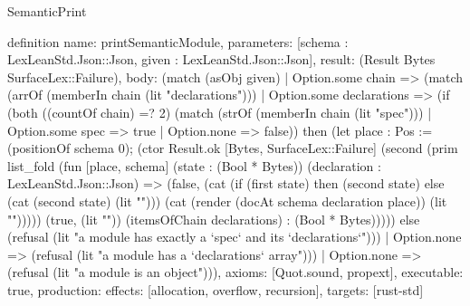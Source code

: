 \begin{lexlean}{SemanticPrint}
\begin{semanticmodule}
definition{
  name: printSemanticModule,
  parameters: [schema : LexLeanStd.Json::Json, given : LexLeanStd.Json::Json],
  result: (Result Bytes SurfaceLex::Failure),
  body: (match (asObj given)
    | Option.some chain => (match (arrOf (memberIn chain (lit "declarations")))
      | Option.some declarations => (if (both ((countOf chain) =? 2) (match (strOf (memberIn chain (lit "spec")))
        | Option.some spec => true
        | Option.none => false)) then (let place : Pos := (positionOf schema 0); (ctor Result.ok [Bytes, SurfaceLex::Failure] (second (prim list_fold (fun [place, schema] (state : (Bool * Bytes)) (declaration : LexLeanStd.Json::Json) => (false, (cat (if (first state) then (second state) else (cat (second state) (lit "\n"))) (cat (render (docAt schema declaration place)) (lit "\n"))))) (true, (lit "")) (itemsOfChain declarations) : (Bool * Bytes))))) else (refusal (lit "a module has exactly a `spec` and its `declarations`")))
      | Option.none => (refusal (lit "a module has a `declarations` array")))
    | Option.none => (refusal (lit "a module is an object"))),
  axioms: [Quot.sound, propext],
  executable: true,
  production: {effects: [allocation, overflow, recursion], targets: [rust-std]}
}
\end{semanticmodule}
\end{lexlean}
